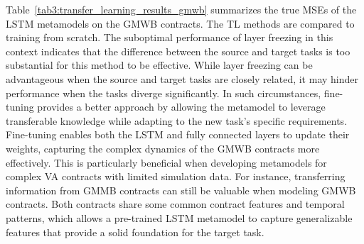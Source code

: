 Table~\ref{tab3:transfer_learning_results_gmwb} summarizes the true MSEs of the LSTM metamodels on the GMWB contracts.
The TL methods are compared to training from scratch.
The suboptimal performance of layer freezing in this context indicates that the difference between the source and target tasks is too substantial for this method to be effective. 
While layer freezing can be advantageous when the source and target tasks are closely related, it may hinder performance when the tasks diverge significantly.
In such circumstances, fine-tuning provides a better approach by allowing the metamodel to leverage transferable knowledge while adapting to the new task's specific requirements. 
Fine-tuning enables both the LSTM and fully connected layers to update their weights, capturing the complex dynamics of the GMWB contracts more effectively.
This is particularly beneficial when developing metamodels for complex VA contracts with limited simulation data. 
For instance, transferring information from GMMB contracts can still be valuable when modeling GMWB contracts.
Both contracts share some common contract features and temporal patterns, which allows a pre-trained LSTM metamodel to capture generalizable features that provide a solid foundation for the target task.

